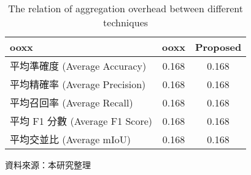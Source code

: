 
\begin{table}[H]
  \caption{The relation of aggregation overhead between different techniques}
  \label{tab:system}
  \centering
  \vspace{5pt}
  \begin{tabular}{|l|c|c|}
  \hline
  \textbf{ooxx} & \textbf{ooxx} & \textbf{Proposed} \\
  \hline
  平均準確度 (Average Accuracy) & 0.168 & 0.168 \\
  平均精確率 (Average Precision) & 0.168 & 0.168 \\
  平均召回率 (Average Recall) & 0.168 & 0.168 \\
  平均 F1 分數 (Average F1 Score) & 0.168 & 0.168 \\
  平均交並比 (Average mIoU) & 0.168 & 0.168 \\
  \hline
  \end{tabular}
  \vspace{5pt}
  \flushleft \hspace{70pt} 資料來源：本研究整理 %
\end{table}